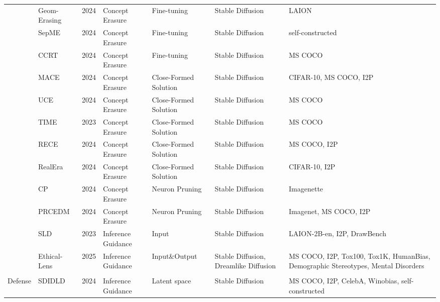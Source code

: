 \begin{table*}[htp]
{\begin{tabular}{p{}p{}p{}p{}p{}p{}p{}}
\cellcolor{white} & Geom-Erasing\cite{liu2024implicit} & 2024 & Concept Erasure & Fine-tuning & Stable Diffusion & LAION \\
\cellcolor{white} & SepME\cite{zhao2024separable} & 2024 & Concept Erasure & Fine-tuning & Stable Diffusion & self-constructed \\
\cellcolor{white} & CCRT~\cite{han2024continuous} & 2024 & Concept Erasure & Fine-tuning & Stable Diffusion & MS COCO \\
\cellcolor{white} & MACE\cite{lu2024mace} & 2024 & Concept Erasure & Close-Formed Solution & Stable Diffusion & CIFAR-10, MS COCO, I2P \\
\cellcolor{white} & UCE\cite{gandikota2024unified} & 2024 & Concept Erasure & Close-Formed Solution & Stable Diffusion & MS COCO \\
\cellcolor{white} & TIME\cite{orgad2023editing} & 2023 & Concept Erasure & Close-Formed Solution & Stable Diffusion & MS COCO \\
\cellcolor{white} & RECE\cite{gong2024reliable} & 2024 & Concept Erasure & Close-Formed Solution & Stable Diffusion & MS COCO, I2P \\
\cellcolor{white} & RealEra\cite{liu2024realera} & 2024 & Concept Erasure & Close-Formed Solution & Stable Diffusion & CIFAR-10, I2P \\
\cellcolor{white} & CP\cite{chavhan2024conceptprune} & 2024 & Concept Erasure & Neuron Pruning & Stable Diffusion & Imagenette \\
\cellcolor{white} & PRCEDM\cite{yang2024pruning} & 2024 & Concept Erasure & Neuron Pruning & Stable Diffusion & Imagenet, MS COCO, I2P \\ 
\cellcolor{white} & SLD\cite{schramowski2023safe} & 2023 & Inference Guidance & Input & Stable Diffusion & LAION-2B-en, I2P, DrawBench \\ 
\cellcolor{white} & Ethical-Lens\cite{cai2024ethical} & 2025 & Inference Guidance & Input\&Output & Stable Diffusion, Dreamlike Diffusion & MS COCO, I2P, Tox100, Tox1K, HumanBias, Demographic Stereotypes, Mental Disorders \\ 
\cellcolor{white}\multirow{-24}{0.1\textwidth}{Jailbreak \\ Defense} & SDIDLD\cite{li2024self} & 2024 & Inference Guidance & Latent space & Stable Diffusion & MS COCO, I2P, CelebA, Winobias, self-constructed  \\ 
\hline




\end{tabular}}
\end{table*}
